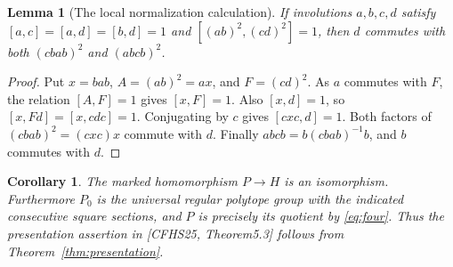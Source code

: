 \documentclass[11pt,a4paper]{article}
\newtheorem{lemma}[theorem]{Lemma}
\newtheorem{corollary}[theorem]{Corollary}
\theoremstyle{remark}\newtheorem{remark}[theorem]{Remark}
\begin{document}
\begin{lemma}[The local normalization calculation]\label{lem:four}
If involutions $a,b,c,d$ satisfy $[a,c]=[a,d]=[b,d]=1$ and
$[(ab)^2,(cd)^2]=1$, then $d$ commutes with both $(cbab)^2$ and
$(abcb)^2$.
\end{lemma}
\begin{proof}
Put $x=bab$, $A=(ab)^2=ax$, and $F=(cd)^2$. As $a$ commutes with $F$,
the relation $[A,F]=1$ gives $[x,F]=1$. Also $[x,d]=1$, so
$[x,Fd]=[x,cdc]=1$. Conjugating by $c$ gives $[cxc,d]=1$.
Both factors of $(cbab)^2=(cxc)x$ commute with $d$. Finally
$abcb=b(cbab)^{-1}b$, and $b$ commutes with $d$.
\end{proof}

\begin{corollary}\label{cor:path}
The marked homomorphism $P\to H$ is an isomorphism. Furthermore $P_0$ is
the universal regular polytope group with the indicated consecutive square
sections, and $P$ is precisely its quotient by \eqref{eq:four}. Thus the
presentation assertion in [CFHS25, Theorem5.3] follows from
Theorem~\ref{thm:presentation}.
\end{corollary}
\end{document}
